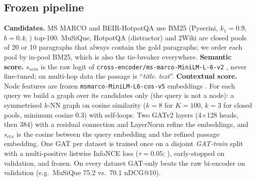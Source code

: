 \documentclass[11pt]{article}
\newcommand{\sem}{s_{\mathit{sem}}}
\newcommand{\ctx}{s_{\mathit{ctx}}}
\begin{document}
\subsection{Frozen pipeline}
\textbf{Candidates.} MS MARCO and BEIR-HotpotQA use BM25 (Pyserini, $k_1{=}0.9$, $b{=}0.4$;
\citealp{robertson2009bm25,lin2021pyserini}) top-100. MuSiQue, HotpotQA (distractor) and 2Wiki are
closed pools of 20 or 10 paragraphs that always contain the gold paragraphs; we order each pool by
in-pool BM25, which is also the tie-breaker everywhere.
\textbf{Semantic score.} $\sem$ is the raw logit of \texttt{cross-encoder/ms-marco-MiniLM-L-6-v2}
\citep{wang2020minilm}, never fine-tuned; on multi-hop data the passage is ``\emph{title}. \emph{text}''.
\textbf{Contextual score.} Node features are frozen \texttt{msmarco-MiniLM-L6-cos-v5} embeddings
\citep{reimers2019sbert}. For each query we build a graph over its candidates only (the query is not
a node): a symmetrised $k$-NN graph on cosine similarity ($k{=}8$ for $K{=}100$, $k{=}3$ for closed
pools, minimum cosine 0.3) with self-loops. Two GATv2 layers (4$\times$128 heads, then 384) with a
residual connection and LayerNorm refine the embeddings, and $\ctx$ is the cosine between the query
embedding and the refined passage embedding. One GAT per dataset is trained once on a disjoint
\emph{GAT-train} split with a multi-positive listwise InfoNCE loss ($\tau{=}0.05$;
\citealp{oord2018cpc}), early-stopped on validation, and frozen. On every dataset GAT-only beats the
raw bi-encoder on validation (e.g.\ MuSiQue 75.2 vs.\ 70.1 nDCG@10).
\end{document}
